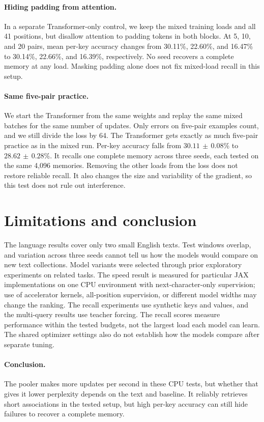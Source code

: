 \documentclass[11pt]{article}
\newcommand{\pmv}[2]{\ensuremath{#1\,\pm\,#2}}
\begin{document}
\paragraph{Hiding padding from attention.}
In a separate Transformer-only control, we keep the mixed training loads and all 41 positions, but disallow attention to padding tokens in both blocks. At 5, 10, and 20 pairs, mean per-key accuracy changes from 30.11\%, 22.60\%, and 16.47\% to 30.14\%, 22.66\%, and 16.39\%, respectively. No seed recovers a complete memory at any load. Masking padding alone does not fix mixed-load recall in this setup.

\paragraph{Same five-pair practice.}
We start the Transformer from the same weights and replay the same mixed batches for the same number of updates. Only errors on five-pair examples count, and we still divide the loss by 64. The Transformer gets exactly as much five-pair practice as in the mixed run. Per-key accuracy falls from \pmv{30.11}{0.08}\% to \pmv{28.62}{0.28}\%. It recalls one complete memory across three seeds, each tested on the same 4,096 memories. Removing the other loads from the loss does not restore reliable recall. It also changes the size and variability of the gradient, so this test does not rule out interference.

\section{Limitations and conclusion}
The language results cover only two small English texts. Test windows overlap, and variation across three seeds cannot tell us how the models would compare on new text collections. Model variants were selected through prior exploratory experiments on related tasks. The speed result is measured for particular JAX implementations on one CPU environment with next-character-only supervision; use of accelerator kernels, all-position supervision, or different model widths may change the ranking. The recall experiments use synthetic keys and values, and the multi-query results use teacher forcing. The recall scores measure performance within the tested budgets, not the largest load each model can learn. The shared optimizer settings also do not establish how the models compare after separate tuning.

\begin{samepage}
\paragraph{Conclusion.}
The pooler makes more updates per second in these CPU tests, but whether that gives it lower perplexity depends on the text and baseline. It reliably retrieves short associations in the tested setup, but high per-key accuracy can still hide failures to recover a complete memory.

\end{samepage}
\end{document}
